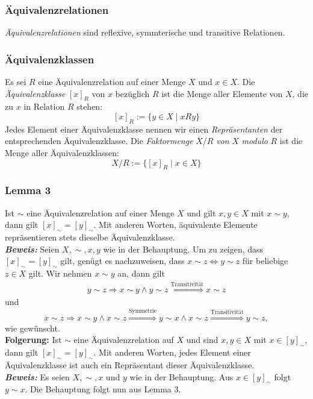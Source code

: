 \subsubsection{Äquivalenzrelationen}%
\label{ssub:äquivalenzrelationen}
\textit{Äquivalenzrelationen} sind reflexive, symmterische und transitive Relationen.

\subsubsection{Äquivalenzklassen}%
\label{ssub:äquivalenzklassen}
Es sei $R$ eine Äquivalenzrelation auf einer Menge $X$ und $x\in X$. Die \textit{Äquivalenzklasse} $[x]_R$ von $x$ bezüglich $R$ ist die Menge aller Elemente von $X$, die zu $x$ in Relation $R$ stehen:
\[
	[x]_R:=\{y\in X\mid xRy \}
\]
Jedes Element einer Äquivalenzklasse nennen wir einen \textit{Repräsentanten} der entsprechenden Äquivalenzklasse.
Die \textit{Faktormenge} $X/R$ \textit{von} $X$ \textit{modulo} $R$ ist die Menge aller Äquivalenzklassen:
\[
	X/R:=\big\{ [x]_R\mid x\in X \big\}
\]

\subsubsection{Lemma 3}%
\label{ssub:lemma_3}
Ist $\sim $ eine Äquivalenzrelation auf einer Menge $X$ und gilt $x,y\in X$ mit $x\sim y$, dann gilt $[x]_\sim=[y]_\sim$. Mit anderen Worten, äquivalente Elemente repräsentieren stets dieselbe Äquivalenzklasse. \\
\textbf{\textit{Beweis: }}
Seien $X,\sim,x,y$ wie in der Behauptung. Um zu zeigen, dass $[x]_\sim=[y]_\sim$ gilt, genügt es nachzuweisen, dass $x\sim z\Leftrightarrow y\sim z$ für beliebige $z\in X$ gilt. Wir nehmen $x\sim y$ an, dann gilt
\begin{align*}
	y\sim z\Rightarrow x\sim y\land y\sim z \stackrel{\text{Transitivität}}{\Longrightarrow} x\sim z
\end{align*}
und
\[
	x\sim z\Rightarrow x\sim y\land x\sim z\stackrel{\text{Symmetrie}}{\Longrightarrow} y\sim x\land x\sim z\stackrel{\text{Transitivität}}{\Longrightarrow} y\sim z,
\]
wie gewünscht. \\
\textbf{Folgerung: }
Ist $\sim $ eine Äquivalenzrelation auf $X$ und sind $x,y\in X$ mit $x\in[y]_\sim$, dann gilt $[x]_\sim=[y]_\sim$. Mit anderen Worten, jedes Element einer Äquivalenzklasse ist auch ein Repräsentant dieser Äquivalenzklasse. \\
\textbf{\textit{Beweis: }}
Es seien $X,\sim,x$ und $y$ wie in der Behauptung. Aus $x\in[y]_\sim$ folgt $y\sim x$. Die Behauptung folgt nun aus Lemma 3.

